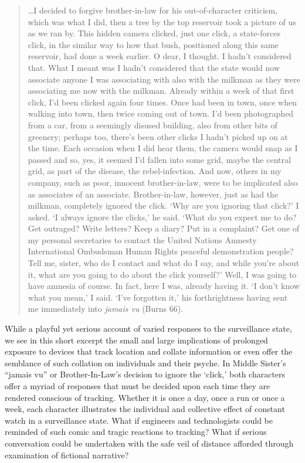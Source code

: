\documentclass[11pt,dvipdfm]{article}
\begin{document}
\begin{quote}
	\ldots I decided to forgive brother-in-law for his out-of-character criticism, which was what I did, then a tree by the top reservoir took a picture of us as we ran by.  This hidden camera clicked, just one click, a state-forces click, in the similar way to how that bush, positioned along this same reservoir, had done a week earlier.  O dear, I thought.  I hadn’t considered that.  What I meant was I hadn’t considered that the state would now associate anyone I was associating with also with the milkman as they were associating me now with the milkman.  Already within a week of that first click, I’d been clicked again four times.  Once had been in town, once when walking into town, then twice coming out of town.  I’d been photographed from a car, from a seemingly disused building, also from other bits of greenery; perhaps too, there’s been other clicks I hadn’t picked up on at the time.  Each occasion when I did hear them, the camera would snap as I passed and so, yes, it seemed I’d fallen into some grid, maybe the central grid, as part of the disease, the rebel-infection.  And now, others in my company, such as poor, innocent brother-in-law, were to be implicated also as associates of an associate.  Brother-in-law, however, just as had the milkman, completely ignored the click.  ‘Why are you ignoring that click?’ I asked.  ‘I always ignore the clicks,’ he said.  ‘What do you expect me to do?  Get outraged?  Write letters?  Keep a diary? Put in a complaint?  Get one of my personal secretaries to contact the United Nations Amnesty International Ombudsman Human Rights peaceful demonstration people?  Tell me, sister, who do I contact and what do I say, and while you’re about it, what are you going to do about the click yourself?’  Well, I was going to have amnesia of course.  In fact, here I was, already having it.  ‘I don’t know what you mean,’ I said.  ‘I’ve forgotten it,’ his forthrightness having sent me immediately into \emph{jamais vu} (Burns 66).
\end{quote}
While a playful yet serious account of varied responses to the surveillance state, we see in this short excerpt the small and large implications of prolonged exposure to devices that track location and collate information or even offer the semblance of such collation on individuals and their psyche.  In Middle Sister’s ``jamais vu'' or Brother-In-Law’s decision to ignore the ‘click,’ both characters offer a myriad of responses that must be decided upon each time they are rendered conscious of tracking. Whether it is once a day, once a run or once a week, each character illustrates the individual and collective effect of constant watch in a surveillance state.  What if engineers and technologists could be reminded of such comic and tragic reactions to tracking?  What if serious conversation could be undertaken with the safe veil of distance afforded through examination of fictional narrative?
\end{document}
